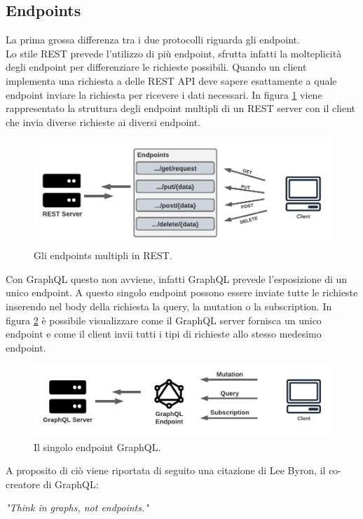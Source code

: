 \subsection{Endpoints}
La prima grossa differenza tra i due protocolli riguarda gli endpoint.\\
Lo stile REST prevede l'utilizzo di più endpoint, sfrutta infatti la molteplicità degli endpoint per differenziare le richieste possibili. Quando un client implementa una richiesta a delle REST API deve sapere esattamente a quale endpoint inviare la richiesta per ricevere i dati necessari. In figura \ref{REST-endpoints} viene rappresentato la struttura degli endpoint multipli di un REST server con il client che invia diverse richieste ai diversi endpoint.
\FloatBarrier
\begin{figure}[!ht]
\centering
\includegraphics[width=1\linewidth]{immagini/RESTEndpoints.pdf}
\caption{Gli endpoints multipli in REST.}
\label{REST-endpoints}
\end{figure}
\FloatBarrier
Con GraphQL questo non avviene, infatti GraphQL prevede l'esposizione di un unico endpoint. A questo singolo endpoint possono essere inviate tutte le richieste inserendo nel body della richiesta la query, la mutation o la subscription. In figura \ref{GraphQL-endpoint} è possibile visualizzare come il GraphQL server fornisca un unico endpoint e come il client invii tutti i tipi di richieste allo stesso medesimo endpoint.
\FloatBarrier
\begin{figure}[!ht]
\centering
\includegraphics[width=1\linewidth]{immagini/GraphQLEndpoint.pdf}
\caption{Il singolo endpoint GraphQL.}
\label{GraphQL-endpoint}
\end{figure}
\FloatBarrier
A proposito di ciò viene riportata di seguito una citazione di Lee Byron, il co-creatore di GraphQL:
\begin{quoting}
  \textit{"Think in graphs, not endpoints."}
\end{quoting}
